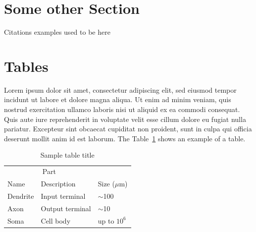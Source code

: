 \documentclass{article}
\begin{document}
\section{Some other Section}

Citations examples used to be here


\section{Tables}

Lorem ipsum dolor sit amet, consectetur adipiscing elit, sed eiusmod tempor incidunt ut labore et dolore magna aliqua. Ut enim ad minim veniam, quis nostrud exercitation ullamco laboris nisi ut aliquid ex ea commodi consequat. Quis aute iure reprehenderit in voluptate velit esse cillum dolore eu fugiat nulla pariatur. Excepteur sint obcaecat cupiditat non proident, sunt in culpa qui officia deserunt mollit anim id est laborum. The Table~\ref{sample-table} shows an example of a table.

\begin{table}[H]
  \caption{Sample table title}
  \label{sample-table}
  \centering
  \begin{tabular}{lll}
    \toprule
    \multicolumn{2}{c}{Part}                   \\
    \cmidrule(r){1-2}
    Name     & Description     & Size ($\mu$m) \\
    \midrule
    Dendrite & Input terminal  & $\sim$100     \\
    Axon     & Output terminal & $\sim$10      \\
    Soma     & Cell body       & up to $10^6$  \\
    \bottomrule
  \end{tabular}
\end{table}
\end{document}

